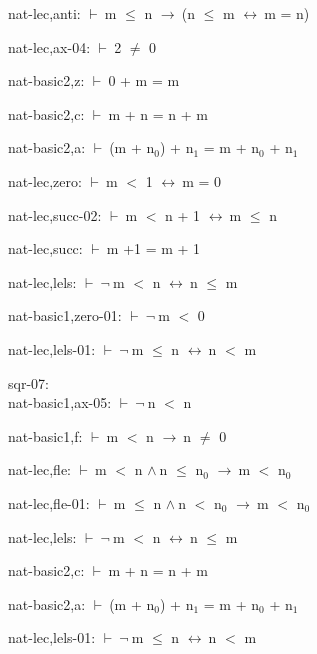 \documentclass[a4paper]{article}
\newcommand{\Fol}{\mbox{$\vdash\ $}}
\newcommand{\Not}{\mbox{$\neg\ $}}
\newcommand{\And}{\mbox{$\wedge\ $}}
\newcommand{\Imp}{\mbox{$\rightarrow\ $}}
\newcommand{\Equiv}{\mbox{$\leftrightarrow\ $}}
\begin{document}
nat-lec,anti: 
 \Fol m $\le$ n \Imp (n $\le$ m \Equiv m = n)



nat-lec,ax-04: 
 \Fol 2 $\neq$ 0



nat-basic2,z: 
 \Fol 0 + m = m



nat-basic2,c: 
 \Fol m + n = n + m



nat-basic2,a: 
 \Fol (m + $\mbox{n}_{0}$) + $\mbox{n}_{1}$ = m + $\mbox{n}_{0}$ + $\mbox{n}_{1}$



nat-lec,zero: 
 \Fol m $<$ 1 \Equiv m = 0



nat-lec,succ-02: 
 \Fol m $<$ n + 1 \Equiv m $\le$ n



nat-lec,succ: 
 \Fol m +1 = m + 1



nat-lec,lels: 
 \Fol \Not m $<$ n \Equiv n $\le$ m



nat-basic1,zero-01: 
 \Fol \Not m $<$ 0



nat-lec,lels-01: 
 \Fol \Not m $\le$ n \Equiv n $<$ m



\bigskip

sqr-07:\\ nat-basic1,ax-05: 
 \Fol \Not n $<$ n



nat-basic1,f: 
 \Fol m $<$ n \Imp n $\neq$ 0



nat-lec,fle: 
 \Fol m $<$ n \And n $\le$ $\mbox{n}_{0}$ \Imp m $<$ $\mbox{n}_{0}$



nat-lec,fle-01: 
 \Fol m $\le$ n \And n $<$ $\mbox{n}_{0}$ \Imp m $<$ $\mbox{n}_{0}$



nat-lec,lels: 
 \Fol \Not m $<$ n \Equiv n $\le$ m



nat-basic2,c: 
 \Fol m + n = n + m



nat-basic2,a: 
 \Fol (m + $\mbox{n}_{0}$) + $\mbox{n}_{1}$ = m + $\mbox{n}_{0}$ + $\mbox{n}_{1}$



nat-lec,lels-01: 
 \Fol \Not m $\le$ n \Equiv n $<$ m
\end{document}
